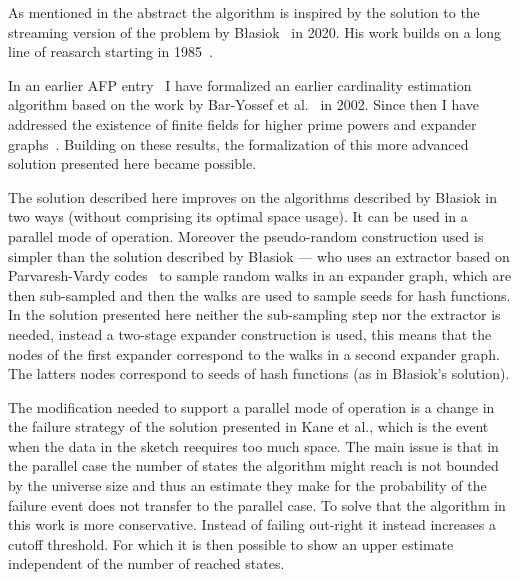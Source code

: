 \documentclass[11pt,a4paper]{article}
\begin{document}
As mentioned in the abstract the algorithm is inspired by the solution to the streaming version
of the problem by B\l{}asiok~\cite{blasiok2020} in 2020. His work builds on a long line of reasarch
starting in 1985~\cite{flajolet1985, alon1999, baryossef2002, kane2010, woodruff2004, gibbons2001}.

In an earlier AFP entry~\cite{Frequency_Moments-AFP} I have formalized an earlier cardinality 
estimation algorithm based on the work by Bar-Yossef et al.~\cite{baryossef2002} in 2002. Since then
I have addressed the existence of finite fields for higher prime powers and
expander graphs~\cite{Finite_Fields-AFP, Expander_Graphs-AFP}. Building on these results,
the formalization of this more advanced solution presented here became possible.

The solution described here improves on the algorithms described by B\l{}asiok in two ways 
(without comprising its optimal space usage). It can be used in a parallel mode of operation.
Moreover the pseudo-random construction used is simpler than the solution described by B\l{}asiok 
--- who uses an extractor based on Parvaresh-Vardy codes~\cite{guruswami2009} to sample random walks
in an expander graph, which are then sub-sampled and then the walks are used to sample seeds for
hash functions. In the solution presented here neither the sub-sampling step nor the extractor is 
needed, instead a two-stage expander construction is used, this means that the nodes of the first 
expander correspond to the walks in a second expander graph. The latters nodes correspond to seeds 
of hash functions (as in B\l{}asiok's solution).

The modification needed to support a parallel mode of operation is a change in the failure strategy
of the solution presented in Kane et al., which is the event when the data in the sketch reequires
too much space. The main issue is that in the parallel case the number of states the algorithm might
reach is not bounded by the universe size and thus an estimate they make for the probability of the
failure event does not transfer to the parallel case. To solve that the algorithm in this work is
more conservative. Instead of failing out-right it instead increases a cutoff threshold. For which
it is then possible to show an upper estimate independent of the number of reached states.





\end{document}
